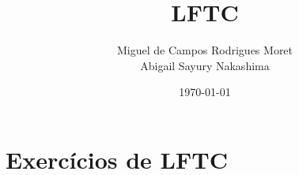 \documentclass[a4paper, 12pt]{article}
\title{LFTC}
\author{Miguel de Campos Rodrigues Moret \\ Abigail Sayury Nakashima}
\date{\today}
\begin{document}
\maketitle
\tableofcontents
\newpage

\section{Exercícios de LFTC}




\end{document}
